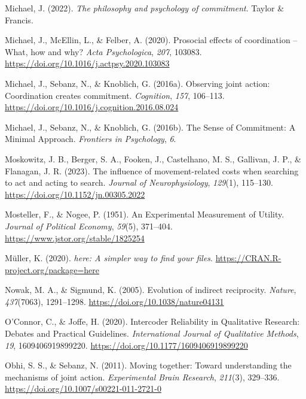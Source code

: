 \documentclass[
  man,
  floatsintext,
  longtable,
  nolmodern,
  notxfonts,
  notimes,
  colorlinks=true,linkcolor=blue,citecolor=blue,urlcolor=blue]{apa7}
\newlength{\cslhangindent}
\newenvironment{CSLReferences}[2] %
 {\begin{list}{}{%
  \setlength{\itemindent}{0pt}
  \setlength{\leftmargin}{0pt}
  \setlength{\parsep}{0pt}
  \ifodd #1
   \setlength{\leftmargin}{\cslhangindent}
   \setlength{\itemindent}{-1\cslhangindent}
  \fi
  \setlength{\itemsep}{#2\baselineskip}}}
 {\end{list}}
\begin{document}
\begin{CSLReferences}{1}{0}
Michael, J. (2022). \emph{The philosophy and psychology of commitment}.
Taylor \& Francis.

Michael, J., McEllin, L., \& Felber, A. (2020). Prosocial effects of
coordination -- {What}, how and why? \emph{Acta Psychologica},
\emph{207}, 103083. \url{https://doi.org/10.1016/j.actpsy.2020.103083}

Michael, J., Sebanz, N., \& Knoblich, G. (2016a). Observing joint
action: {Coordination} creates commitment. \emph{Cognition}, \emph{157},
106--113. \url{https://doi.org/10.1016/j.cognition.2016.08.024}

Michael, J., Sebanz, N., \& Knoblich, G. (2016b). The {Sense} of
{Commitment}: {A Minimal Approach}. \emph{Frontiers in Psychology},
\emph{6}.

Moskowitz, J. B., Berger, S. A., Fooken, J., Castelhano, M. S.,
Gallivan, J. P., \& Flanagan, J. R. (2023). The influence of
movement-related costs when searching to act and acting to search.
\emph{Journal of Neurophysiology}, \emph{129}(1), 115--130.
\url{https://doi.org/10.1152/jn.00305.2022}

Mosteller, F., \& Nogee, P. (1951). An {Experimental Measurement} of
{Utility}. \emph{Journal of Political Economy}, \emph{59}(5), 371--404.
\url{https://www.jstor.org/stable/1825254}

Müller, K. (2020). \emph{{here}: A simpler way to find your files}.
\url{https://CRAN.R-project.org/package=here}

Nowak, M. A., \& Sigmund, K. (2005). Evolution of indirect reciprocity.
\emph{Nature}, \emph{437}(7063), 1291--1298.
\url{https://doi.org/10.1038/nature04131}

O'Connor, C., \& Joffe, H. (2020). Intercoder {Reliability} in
{Qualitative Research}: {Debates} and {Practical Guidelines}.
\emph{International Journal of Qualitative Methods}, \emph{19},
1609406919899220. \url{https://doi.org/10.1177/1609406919899220}

Obhi, S. S., \& Sebanz, N. (2011). Moving together: Toward understanding
the mechanisms of joint action. \emph{Experimental Brain Research},
\emph{211}(3), 329--336. \url{https://doi.org/10.1007/s00221-011-2721-0}


\end{CSLReferences}
\end{document}
